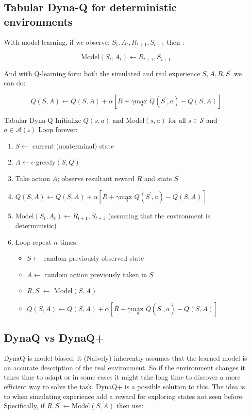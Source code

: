  \subsection{Tabular Dyna-Q for deterministic environments}
 With model learning, if we observe: $S_t, A_t, R_{t+1}, S_{t+1}$ then :

 	\begin{equation}
 		\text{Model}(S_t,A_t) \leftarrow R_{t+1}, S_{t+1}
 	\end{equation}
 
And with Q-learning form both the simulated and real experience $S,A,R,S^{\prime}$ we can do:

	\begin{equation}
		Q(S,A) \leftarrow Q(S,A) + \alpha[R + \gamma \underset{a}{\text{max }} Q(S^{\prime},a)-Q(S,A)]
	\end{equation}

\begin{wbox}{Tabular Dyna-Q}
Initialize $Q(s,a)$ and Model$(s,a)$ for all $s \in \mathcal{S}$ and $a \in \mathcal{A(s)}$	 
Loop forever:
	\begin{enumerate}
		\item $S \leftarrow$ current (nonterminal) state
		\item $A \leftarrow \epsilon$-greedy$(S,Q)$
		\item Take action $A$; observe resultant reward $R$ and state $S^{\prime}$
		\item $Q(S,A) \leftarrow Q(S,A) + \alpha[R + \gamma \underset{a}{\text{max }} Q(S^{\prime},a)-Q(S,A)]$ 
		\item $\text{Model}(S_t,A_t) \leftarrow R_{t+1}, S_{t+1}$ (assuming that the environment is deterministic)
		\item Loop repeat $n$ times:
		\begin{itemize}
			\item $S \leftarrow$ random previously observed state
			\item $A \leftarrow$ random action previously taken in $S$
			\item $R,S^{\prime} \leftarrow $ Model$(S,A)$
			\item $Q(S,A) \leftarrow Q(S,A) + \alpha[R + \gamma \underset{a}{\text{max }} Q(S^{\prime},a)-Q(S,A)]$ 
		\end{itemize}
	\end{enumerate}
\end{wbox}


\subsection{DynaQ vs DynaQ+}
DynaQ is model biased, it (Naively) inherently assumes that the learned model is an accurate description of the real environment. So if the environment changes it takes time to adapt or in some cases it might take long time to discover a more efficient way to solve the task. DynaQ+ is a possible solution to this. The idea is to when simulating experience add a reward for exploring states not seen before: Specifically, if $R, S^{\prime} \leftarrow \text{Model}(S,A)$ then use:

